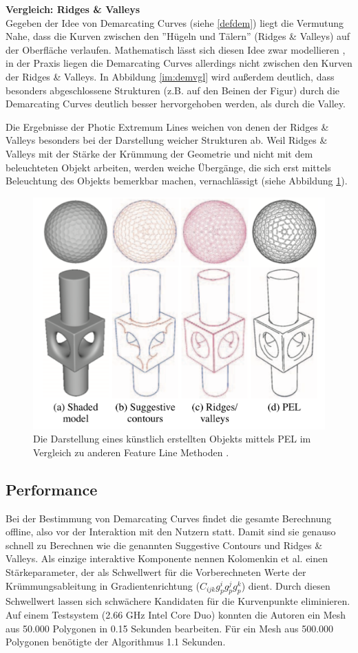 \documentclass{paperStyle}
\begin{document}
\textbf{Vergleich: Ridges \& Valleys}\\
Gegeben der Idee von Demarcating Curves (siehe \ref{defdem}) liegt die Vermutung Nahe, dass die Kurven zwischen den ''Hügeln und Tälern'' (Ridges \& Valleys) auf der Oberfläche verlaufen. Mathematisch lässt sich diesen Idee zwar modellieren \cite{Demarcating}, in der Praxis liegen die Demarcating Curves allerdings nicht zwischen den Kurven der Ridges \& Valleys. In Abbildung \ref{im:demvgl} wird außerdem deutlich, dass besonders abgeschlossene Strukturen (z.B. auf den Beinen der Figur) durch die Demarcating Curves deutlich besser hervorgehoben werden, als durch die Valley.

Die Ergebnisse der Photic Extremum Lines weichen von denen der Ridges \& Valleys besonders bei der Darstellung weicher Strukturen ab.
Weil Ridges \& Valleys mit der Stärke der Krümmung der Geometrie und nicht mit dem beleuchteten Objekt arbeiten, werden weiche Übergänge, die sich erst mittels Beleuchtung des Objekts bemerkbar machen, vernachlässigt (siehe Abbildung \ref{vglpel2}). 
\begin{figure}
	\centering
		\includegraphics[width=0.9\linewidth]{vglpel2.png}
	\caption{Die Darstellung eines künstlich erstellten Objekts mittels PEL im Vergleich zu anderen Feature Line Methoden \cite{Xie2007}.}
	\label{vglpel2}
\end{figure}
\subsection{Performance}
Bei der Bestimmung von Demarcating Curves findet die gesamte Berechnung offline, also vor der Interaktion mit den Nutzern statt. Damit sind sie genauso schnell zu Berechnen wie die genannten Suggestive Contours und Ridges \& Valleys. Als einzige interaktive Komponente nennen Kolomenkin et al. \cite{Demarcating} einen Stärkeparameter, der als Schwellwert für die Vorberechneten Werte der Krümmungsableitung in Gradientenrichtung ($C_{ijk}g_p^ig_p^jg_p^k$) dient. Durch diesen Schwellwert lassen sich schwächere Kandidaten für die Kurvenpunkte eliminieren. Auf einem Testsystem (2.66 GHz Intel Core Duo) konnten die Autoren ein Mesh aus 50.000 Polygonen in 0.15 Sekunden bearbeiten. Für ein Mesh aus 500.000 Polygonen benötigte der Algorithmus 1.1 Sekunden. 
\end{document}
